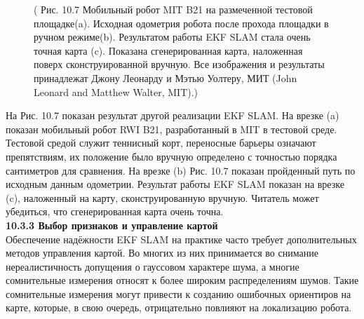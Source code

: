 \documentclass[10pt,a4paper]{article}
\begin{document}
\begin{figure}[H]
	\caption{ ( Рис. 10.7 Мобильный робот MIT B21 на размеченной тестовой площадке(a). Исходная одометрия робота после прохода площадки в ручном режиме(b). Результатом работы EKF SLAM стала очень точная карта (c). Показана сгенерированная карта, наложенная поверх сконструированной вручную. Все изображения и результаты принадлежат Джону Леонарду и Мэтью Уолтеру, МИТ (John Leonard and Matthew Walter, MIT).)}
	\label{fig:107orig}
\end{figure}

На Рис. 10.7 показан результат другой реализации EKF SLAM. На врезке
(a)	показан мобильный робот RWI B21, разработанный в MIT в тестовой среде. Тестовой средой служит теннисный корт, переносные барьеры означают препятствиям, их положение было вручную определено с точностью порядка сантиметров для сравнения. На врезке (b) Рис. 10.7 показан пройденный путь по исходным данным одометрии. Результат работы EKF SLAM показан на врезке (c), наложенный на карту, сконструированную вручную. Читатель может убедиться, что сгенерированная карта очень точна.\\

\textbf{10.3.3	Выбор признаков и управление картой}\\

Обеспечение надёжности EKF SLAM на практике часто требует дополнительных методов управления картой. Во многих из них принимается во снимание нереалистичность допущения о гауссовом характере шума, а многие сомнительные измерения относят к более широким распределениям шумов. Такие сомнительные измерения могут привести к созданию ошибочных ориентиров на карте, которые, в свою очередь, отрицательно повлияют на локализацию робота.\\
\end{document}
